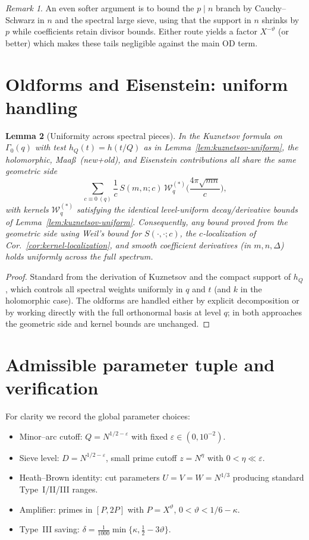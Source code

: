 \documentclass[11pt]{article}
\newtheorem{lemma}{Lemma}[part]
\theoremstyle{definition}
\theoremstyle{remark}
\newtheorem{remark}[lemma]{Remark}
\numberwithin{equation}{part}
\begin{document}
\begin{remark}
	An even softer argument is to bound the $p\mid n$ branch by Cauchy--Schwarz in $n$ and the spectral large sieve, using that the support in $n$ shrinks by $p$ while coefficients retain divisor bounds. Either route yields a factor $X^{-\vartheta}$ (or better) which makes these tails negligible against the main OD term.
\end{remark}

\section{Oldforms and Eisenstein: uniform handling}\label{sec:old-eis}

\begin{lemma}[Uniformity across spectral pieces]\label{lem:oldforms-eis-uniform}
	In the Kuznetsov formula on $\Gamma_0(q)$ with test $h_Q(t)=h(t/Q)$ as in Lemma~\ref{lem:kuznetsov-uniform},
	the holomorphic, Maa\ss\ (new+old), and Eisenstein contributions all share the same geometric side
	\[
		\sum_{c\equiv 0\ (q)} \frac{1}{c}\,S(m,n;c)\,\mathcal W_q^{(*)}\!\Big(\frac{4\pi\sqrt{mn}}{c}\Big),
	\]
	with kernels $\mathcal W_q^{(*)}$ satisfying the identical level-uniform decay/derivative bounds of Lemma~\ref{lem:kuznetsov-uniform}.
	Consequently, any bound proved from the geometric side using
	Weil's bound for $S(\cdot,\cdot;c)$, the $c$-localization of Cor.~\ref{cor:kernel-localization},
	and smooth coefficient derivatives (in $m,n,\Delta$) holds \emph{uniformly} across the full spectrum.
\end{lemma}

\begin{proof}
	Standard from the derivation of Kuznetsov and the compact support of $h_Q$, which controls all spectral weights uniformly in $q$ and $t$ (and $k$ in the holomorphic case). The oldforms are handled either by explicit decomposition or by working directly with the full orthonormal basis at level $q$; in both approaches the geometric side and kernel bounds are unchanged.
\end{proof}

\section{Admissible parameter tuple and verification}

For clarity we record the global parameter choices:
\begin{itemize}
	\item Minor--arc cutoff: $Q=N^{1/2-\varepsilon}$ with fixed $\varepsilon\in(0,10^{-2})$.
	\item Sieve level: $D=N^{1/2-\varepsilon}$, small prime cutoff $z=N^\eta$ with $0<\eta\ll\varepsilon$.
	\item Heath--Brown identity: cut parameters $U=V=W=N^{1/3}$ producing standard Type~I/II/III ranges.
	\item Amplifier: primes in $[P,2P]$ with $P=X^\vartheta$, $0<\vartheta<1/6-\kappa$.
	\item Type~III saving: $\delta=\tfrac{1}{1000}\min\{\kappa,\tfrac12-3\vartheta\}$.
\end{itemize}
\end{document}
